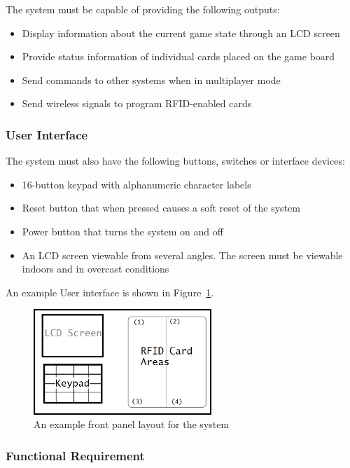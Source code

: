 \documentclass[12pt]{article} %
\begin{document}
The system must be capable of providing the following outputs:
\begin{itemize}
	\item Display information about the current game state through an LCD screen
	\item Provide status information of individual cards placed on the game board
	\item Send commands to other systems when in multiplayer mode
	\item Send wireless signals to program RFID-enabled cards
\end{itemize}

\subsubsection{User Interface}

The system must also have the following buttons, switches or interface devices:

\begin{itemize}
	\item 16-button keypad with alphanumeric character labels
	\item Reset button that when pressed causes a soft reset of the system
	\item Power button that turns the system on and off
	\item An LCD screen viewable from several angles. The screen must be viewable indoors and in overcast conditions
\end{itemize}

An example User interface is shown in Figure~\ref{fig:exampleFrontPanel}.

\begin{figure}[h]
	\centering
	\includegraphics[width=0.6\textwidth]{images/exampleFrontPanel.png}
	\caption{An example front panel layout for the system}
	\label{fig:exampleFrontPanel}
\end{figure}

\subsubsection{Functional Requirement}
\end{document}
